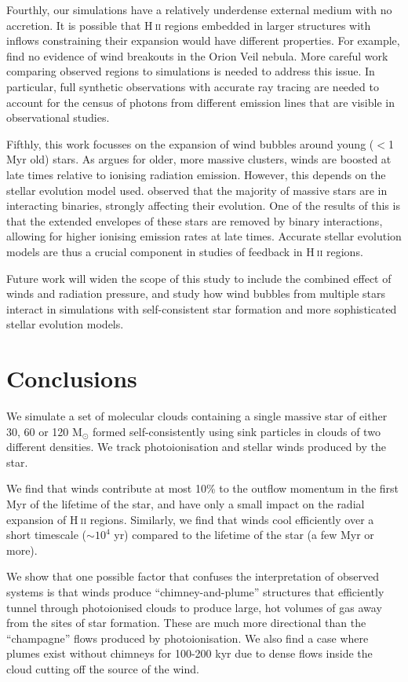 \documentclass[a4paper,fleqn,usenatbib]{mnras}
\newcommand{\Msolar}{M$_{\odot}$\xspace}
\newcommand{\HII}{H$~$\textsc{ii}\xspace}
\begin{document}
Fourthly, our simulations have a relatively underdense external medium with no accretion. It is possible that \HII regions embedded in larger structures with inflows constraining their expansion would have different properties. For example, \cite{Pabst2019} find no evidence of wind breakouts in the Orion Veil nebula. More careful work comparing observed regions to simulations is needed to address this issue. In particular, full synthetic observations with accurate ray tracing are needed to account for the census of photons from different emission lines that are visible in observational studies.

Fifthly, this work focusses on the expansion of wind bubbles around young ($<$1 Myr old) stars. As \cite{Rahner2017} argues for older, more massive clusters, winds are boosted at late times relative to ionising radiation emission. However, this depends on the stellar evolution model used. \cite{Sana2012} observed that the majority of massive stars are in interacting binaries, strongly affecting their evolution. One of the results of this is that the extended envelopes of these stars are removed by binary interactions, allowing for higher ionising emission rates at late times. Accurate stellar evolution models are thus a crucial component in studies of feedback in \HII regions.

Future work will widen the scope of this study to include the combined effect of winds and radiation pressure, and study how wind bubbles from multiple stars interact in simulations with self-consistent star formation and more sophisticated stellar evolution models.

\section{Conclusions}
\label{conclusions}

We simulate a set of molecular clouds containing a single massive star of either 30, 60 or 120 \Msolar formed self-consistently using sink particles in clouds of two different densities. We track photoionisation and stellar winds produced by the star.

We find that winds contribute at most 10\% to the outflow momentum in the first Myr of the lifetime of the star, and have only a small impact on the radial expansion of \HII regions. Similarly, we find that winds cool efficiently over a short timescale ($\sim 10^4$ yr) compared to the lifetime of the star (a few Myr or more).

We show that one possible factor that confuses the interpretation of observed systems is that winds produce ``chimney-and-plume'' structures that efficiently tunnel through photoionised clouds to produce large, hot volumes of gas away from the sites of star formation. These are much more directional than the ``champagne'' flows produced by photoionisation. We also find a case where plumes exist without chimneys for 100-200 kyr due to dense flows inside the cloud cutting off the source of the wind.
\end{document}
